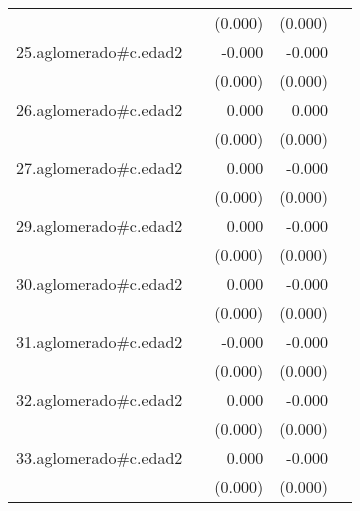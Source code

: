 {\begin{longtable}{l*{4}{D{.}{.}{-1}}}
            &                     &     (0.000)         &     (0.000)         &                     \\
\addlinespace
25.aglomerado#c.edad2&                     &      -0.000         &      -0.000         &                     \\
            &                     &     (0.000)         &     (0.000)         &                     \\
\addlinespace
26.aglomerado#c.edad2&                     &       0.000         &       0.000         &                     \\
            &                     &     (0.000)         &     (0.000)         &                     \\
\addlinespace
27.aglomerado#c.edad2&                     &       0.000         &      -0.000         &                     \\
            &                     &     (0.000)         &     (0.000)         &                     \\
\addlinespace
29.aglomerado#c.edad2&                     &       0.000         &      -0.000         &                     \\
            &                     &     (0.000)         &     (0.000)         &                     \\
\addlinespace
30.aglomerado#c.edad2&                     &       0.000         &      -0.000         &                     \\
            &                     &     (0.000)         &     (0.000)         &                     \\
\addlinespace
31.aglomerado#c.edad2&                     &      -0.000         &      -0.000\sym{***}&                     \\
            &                     &     (0.000)         &     (0.000)         &                     \\
\addlinespace
32.aglomerado#c.edad2&                     &       0.000         &      -0.000         &                     \\
            &                     &     (0.000)         &     (0.000)         &                     \\
\addlinespace
33.aglomerado#c.edad2&                     &       0.000         &      -0.000         &                     \\
            &                     &     (0.000)         &     (0.000)         &                     \\

\end{longtable}}
